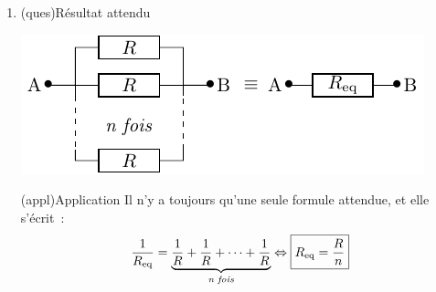 \documentclass[../../main/main.tex]{subfiles}
\begin{document}
{\begin{enumerate}
\begin{center}
\begin{tcb}[width=\linewidth]
			      \end{tcb}
		      \end{center}
		\item
		      \begin{tcbraster}[raster columns=2, raster equal height=rows]
			      \begin{tcb}(ques){Résultat attendu}
				      \begin{center}
					      \includegraphics{nparrequiv}
				      \end{center}
			      \end{tcb}
			      \begin{tcb}(appl){Application}
				      Il n'y a toujours qu'une seule formule attendue, et elle s'écrit~:
				      \[ \frac{1}{R_{\rm eq}} = \underbrace{ \frac{1}{R} + \frac{1}{R} +
						      \cdots + \frac{1}{R}}_{\textit{n fois}} \Leftrightarrow
					      \boxed{R_{\rm eq} = \frac{R}{n}} \]
			      \end{tcb}
		      \end{tcbraster}
	\end{enumerate}
}
\end{document}
